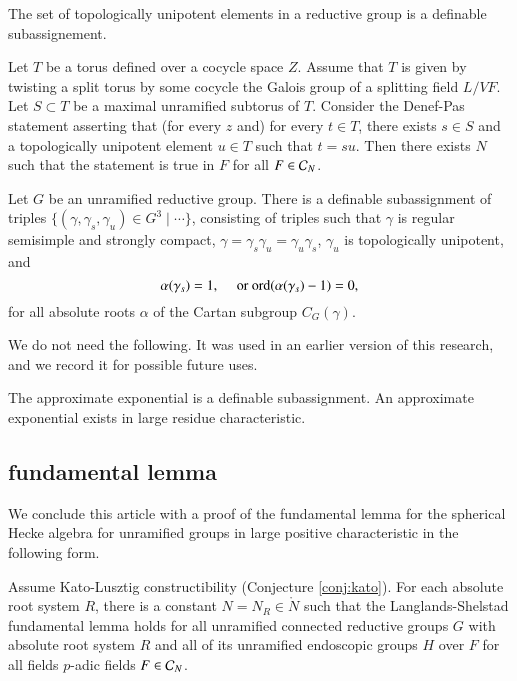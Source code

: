 \begin{lemma} The set of topologically unipotent elements in a reductive group is a definable subassignement.
\end{lemma}

\begin{lemma} Let $T$ be a torus defined over a cocycle space $Z$. Assume that $T$ is given by twisting a split torus by some cocycle the Galois group
of a splitting field $L/VF$.  Let $S\subset T$ be a maximal unramified subtorus of $T$.  Consider the Denef-Pas statement asserting that (for every $z$ and) for
every $t\in T$, there exists $s\in S$ and a topologically unipotent element $u\in T$ such that $t =s u$.  Then there exists $N$ such that the statement is
true in $F$ for all $F\in \mathcal C_N$.
\end{lemma}

\begin{lemma} 
Let $G$ be an unramified reductive group.  There is a definable subassignment of triples $\{(\gamma,\gamma_s,\gamma_u)\in G^3 \mid \cdots\}$,
consisting of triples such that $\gamma$ is regular semisimple and strongly compact, 
$\gamma = \gamma_s \gamma_u = \gamma_u\gamma_s$, $\gamma_u$ is topologically unipotent, and
\[
\alpha(\gamma_s)=1,\quad\text{ or } {\operatorname{ord}}(\alpha(\gamma_s)-1)=0,
\]
for all absolute roots $\alpha$ of the Cartan subgroup $C_G(\gamma)$.
\end{lemma}

We do not need the following. It was used in an earlier version of this research, and we record it for possible future uses.

\begin{lemma} The approximate exponential is a definable subassignment.  An approximate exponential exists in large residue characteristic.
\end{lemma}


\subsection{fundamental lemma}

We conclude this article with a proof of the fundamental lemma for the spherical Hecke algebra for unramified groups in large positive characteristic
in the following form.

\begin{theorem}  Assume Kato-Lusztig constructibility (Conjecture \ref{conj:kato}).
For each absolute root system $R$,
there is a constant $N=N_R\in\ring{N}$ such that
the Langlands-Shelstad fundamental lemma holds for all unramified connected reductive groups $G$ with absolute root system $R$ 
and all of its unramified endoscopic groups $H$ over $F$ 
for all fields $p$-adic fields $F\in \mathcal C_N$.
\end{theorem}

